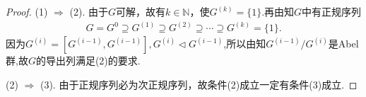\documentclass[../../main.tex]{subfiles}%
\begin{document}
\begin{proof}
(1) $\Rightarrow$ (2). 由于$G$可解，故有$k\in \mathbb{N}$，使$G^{(k)} = \{1\}$.再由知$G$中有正规序列
\begin{align*}
G =G^{0}\supseteq G^{(1)} \supseteq G^{(2)} \supseteq \cdots \supseteq G^{(k)} = \{1\}.
\end{align*}
因为$G^{\left( i \right)}=\left[ G^{\left( i-1 \right)},G^{\left( i-1 \right)} \right] ,G^{\left( i \right)}\lhd G^{\left( i-1 \right)}$,所以由知$G^{(i-1)}/G^{(i)}$是Abel群,故$G$的导出列满足(2)的要求.

(2) $\Rightarrow$ (3). 由于正规序列必为次正规序列，故条件(2)成立一定有条件(3)成立.


\end{proof}
\end{document}
